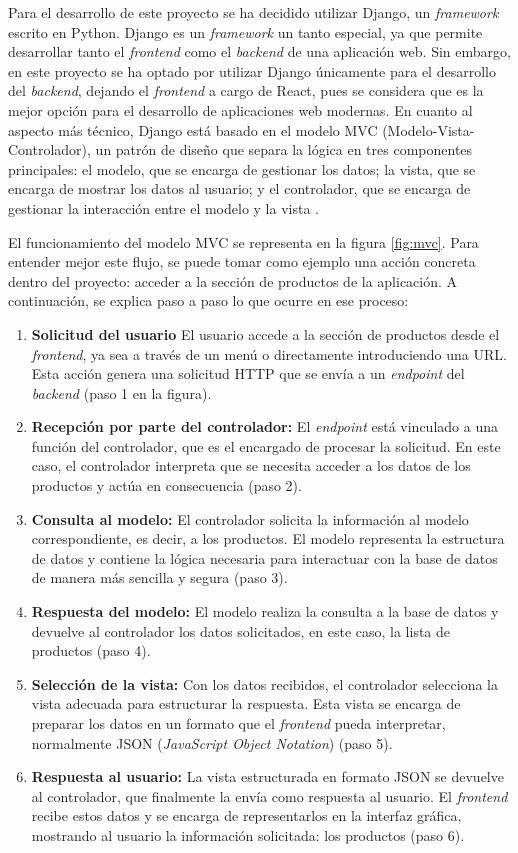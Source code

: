 Para el desarrollo de este proyecto se ha decidido utilizar Django, un \textit{framework} escrito en Python. Django es un \textit{framework} un tanto especial, ya que permite desarrollar tanto el \textit{frontend} como el \textit{backend} de una aplicación web. Sin embargo, en este proyecto se ha optado por utilizar Django únicamente para el desarrollo del \textit{backend}, dejando el \textit{frontend} a cargo de React, pues se considera que es la mejor opción para el desarrollo de aplicaciones web modernas. En cuanto al aspecto más técnico, Django está basado en el modelo MVC (Modelo-Vista-Controlador), un patrón de diseño que separa la lógica en tres componentes principales: el modelo, que se encarga de gestionar los datos; la vista, que se encarga de mostrar los datos al usuario; y el controlador, que se encarga de gestionar la interacción entre el modelo y la vista \cite{mvc}.

El funcionamiento del modelo MVC se representa en la figura \ref{fig:mvc}. Para entender mejor este flujo, se puede tomar como ejemplo una acción concreta dentro del proyecto: acceder a la sección de productos de la aplicación. A continuación, se explica paso a paso lo que ocurre en ese proceso:

\begin{enumerate}
    \item \textbf{Solicitud del usuario} El usuario accede a la sección de productos desde el \textit{frontend}, ya sea a través de un menú o directamente introduciendo una URL. Esta acción genera una solicitud HTTP que se envía a un \textit{endpoint} del \textit{backend} (paso 1 en la figura).
    \item \textbf{Recepción por parte del controlador:} El \textit{endpoint} está vinculado a una función del controlador, que es el encargado de procesar la solicitud. En este caso, el controlador interpreta que se necesita acceder a los datos de los productos y actúa en consecuencia (paso 2).
    \item \textbf{Consulta al modelo:} El controlador solicita la información al modelo correspondiente, es decir, a los productos. El modelo representa la estructura de datos y contiene la lógica necesaria para interactuar con la base de datos de manera más sencilla y segura (paso 3).
    \item \textbf{Respuesta del modelo:} El modelo realiza la consulta a la base de datos y devuelve al controlador los datos solicitados, en este caso, la lista de productos (paso 4).
    \item \textbf{Selección de la vista:} Con los datos recibidos, el controlador selecciona la vista adecuada para estructurar la respuesta. Esta vista se encarga de preparar los datos en un formato que el \textit{frontend} pueda interpretar, normalmente JSON (\textit{JavaScript Object Notation}) (paso 5).
    \item \textbf{Respuesta al usuario:} La vista estructurada en formato JSON se devuelve al controlador, que finalmente la envía como respuesta al usuario. El \textit{frontend} recibe estos datos y se encarga de representarlos en la interfaz gráfica, mostrando al usuario la información solicitada: los productos (paso 6).
\end{enumerate}

